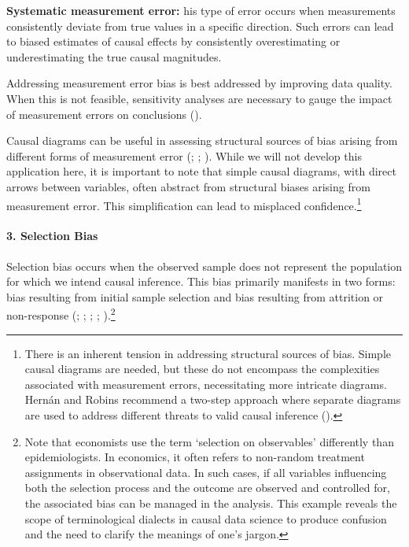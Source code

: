 \documentclass[
  singlecolumn,
  9pt]{article}
\let\oldparagraph\paragraph
\renewcommand{\paragraph}[1]{\oldparagraph{#1}\mbox{}}
\begin{document}
\textbf{Systematic measurement error:} his type of error occurs when
measurements consistently deviate from true values in a specific
direction. Such errors can lead to biased estimates of causal effects by
consistently overestimating or underestimating the true causal
magnitudes.

Addressing measurement error bias is best addressed by improving data
quality. When this is not feasible, sensitivity analyses are necessary
to gauge the impact of measurement errors on conclusions
().

Causal diagrams can be useful in assessing structural sources of bias
arising from different forms of measurement error
(;
;
). While we
will not develop this application here, it is important to note that
simple causal diagrams, with direct arrows between variables, often
abstract from structural biases arising from measurement error. This
simplification can lead to misplaced confidence.\footnote{There is an
  inherent tension in addressing structural sources of bias. Simple
  causal diagrams are needed, but these do not encompass the
  complexities associated with measurement errors, necessitating more
  intricate diagrams. Hernán and Robins recommend a two-step approach
  where separate diagrams are used to address different threats to valid
  causal inference ().}

\paragraph{3. Selection Bias}\label{selection-bias}

Selection bias occurs when the observed sample does not represent the
population for which we intend causal inference. This bias primarily
manifests in two forms: bias resulting from initial sample selection and
bias resulting from attrition or non-response
(;
;
; ; ).\footnote{Note that economists use the term `selection on
  observables' differently than epidemiologists. In economics, it often
  refers to non-random treatment assignments in observational data. In
  such cases, if all variables influencing both the selection process
  and the outcome are observed and controlled for, the associated bias
  can be managed in the analysis. This example reveals the scope of
  terminological dialects in causal data science to produce confusion
  and the need to clarify the meanings of one's jargon.}
\end{document}
